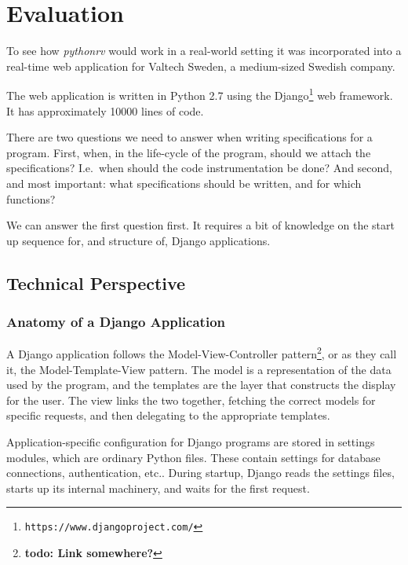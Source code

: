 \documentclass[a4paper,11pt]{kth-mag}
\newcommand{\todo}[1]{\textbf{todo: #1}}
\begin{document}

\pagestyle{newchap}
\chapter{Evaluation} \label{chapter-evaluation}

To see how \textit{pythonrv} would work in a real-world setting it was
incorporated into a real-time web application for Valtech Sweden, a
medium-sized Swedish company.

The web application is written in Python 2.7 using the
Django\footnote{\texttt{https://www.djangoproject.com/}} web framework. It has
approximately 10000 lines of code.

There are two questions we need to answer when writing specifications for a
program. First, when, in the life-cycle of the program, should we attach the
specifications? I.e.\ when should the code instrumentation be done? And second,
and most important: what specifications should be written, and for which
functions?

We can answer the first question first. It requires a bit of knowledge on the
start up sequence for, and structure of, Django applications.


\section{Technical Perspective}


\subsection{Anatomy of a Django Application}

A Django application follows the Model-View-Controller
pattern\footnote{\todo{Link somewhere?}}, or as they call it, the
Model-Template-View pattern. The model is a representation of the data used by
the program, and the templates are the layer that constructs the display for
the user. The view links the two together, fetching the correct models for
specific requests, and then delegating to the appropriate templates.

Application-specific configuration for Django programs are stored in settings
modules, which are ordinary Python files. These contain settings for database
connections, authentication, etc.. During startup, Django reads the settings
files, starts up its internal machinery, and waits for the first request.
\end{document}
